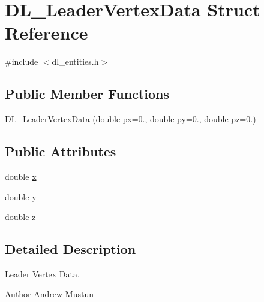 \hypertarget{structDL__LeaderVertexData}{\section{D\-L\-\_\-\-Leader\-Vertex\-Data Struct Reference}
\label{structDL__LeaderVertexData}
}


{\ttfamily \#include $<$dl\-\_\-entities.\-h$>$}

\subsection*{Public Member Functions}
\begin{DoxyCompactItemize}
\item 
\hyperlink{structDL__LeaderVertexData_a00c58ca93c300438b89822c710903732}{D\-L\-\_\-\-Leader\-Vertex\-Data} (double px=0., double py=0., double pz=0.)
\end{DoxyCompactItemize}
\subsection*{Public Attributes}
\begin{DoxyCompactItemize}
\item 
double \hyperlink{structDL__LeaderVertexData_af845d6ab31f92b5fe67569a4149eb8ca}{x}
\item 
double \hyperlink{structDL__LeaderVertexData_ad503edab52b45c36803a2174c3631ae8}{y}
\item 
double \hyperlink{structDL__LeaderVertexData_a9cf4c322e1f7dd360f6202beee3666f1}{z}
\end{DoxyCompactItemize}


\subsection{Detailed Description}
Leader Vertex Data.

\begin{DoxyAuthor}{Author}
Andrew Mustun 
\end{DoxyAuthor}


